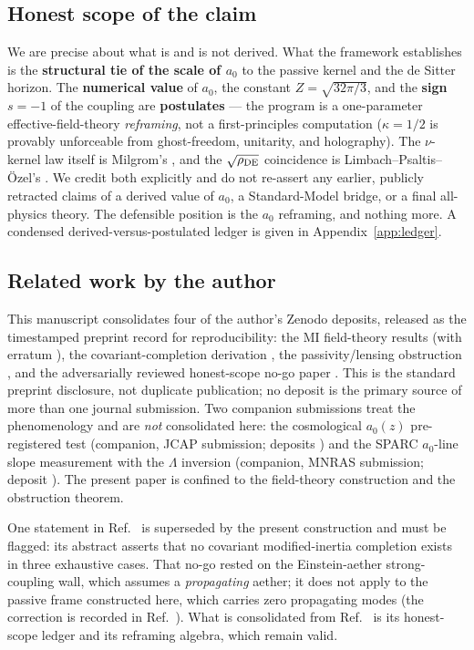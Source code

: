 \documentclass[11pt]{article}
\begin{document}
\subsection{Honest scope of the claim}\label{sec:scope}

We are precise about what is and is not derived. What the framework establishes is the \textbf{structural tie of the scale of $a_0$} to the passive kernel and the de Sitter horizon. The \textbf{numerical value} of $a_0$, the constant $Z=\sqrt{32\pi/3}$, and the \textbf{sign} $s=-1$ of the coupling are \textbf{postulates} --- the program is a one-parameter effective-field-theory \emph{reframing}, not a first-principles computation ($\kappa=1/2$ is provably unforceable from ghost-freedom, unitarity, and holography). The $\nu$-kernel law itself is Milgrom's \cite{milgrom1999}, and the $\sqrt{\rho_{\rm DE}}$ coincidence is Limbach--Psaltis--\"Ozel's \cite{lpo2008}. We credit both explicitly and do not re-assert any earlier, publicly retracted claims of a derived value of $a_0$, a Standard-Model bridge, or a final all-physics theory. The defensible position is the $a_0$ reframing, and nothing more. A condensed derived-versus-postulated ledger is given in Appendix~\ref{app:ledger}.

\subsection{Related work by the author}\label{sec:related}

This manuscript consolidates four of the author's Zenodo deposits, released as the timestamped preprint record for reproducibility: the MI field-theory results \cite{zft} (with erratum \cite{zftE}), the covariant-completion derivation \cite{zconcept}, the passivity/lensing obstruction \cite{znogoL}, and the adversarially reviewed honest-scope no-go paper \cite{zhonest}. This is the standard preprint disclosure, not duplicate publication; no deposit is the primary source of more than one journal submission. Two companion submissions treat the phenomenology and are \emph{not} consolidated here: the cosmological $a_0(z)$ pre-registered test (companion, JCAP submission; deposits \cite{zjcap1,zjcap2,zjcap3}) and the SPARC $a_0$-line slope measurement with the $\Lambda$ inversion (companion, MNRAS submission; deposit \cite{zmnras}). The present paper is confined to the field-theory construction and the obstruction theorem.

One statement in Ref.~\cite{zhonest} is superseded by the present construction and must be flagged: its abstract asserts that no covariant modified-inertia completion exists in three exhaustive cases. That no-go rested on the Einstein-aether strong-coupling wall, which assumes a \emph{propagating} aether; it does not apply to the passive frame constructed here, which carries zero propagating modes (the correction is recorded in Ref.~\cite{zv3}). What is consolidated from Ref.~\cite{zhonest} is its honest-scope ledger and its reframing algebra, which remain valid.
\end{document}
